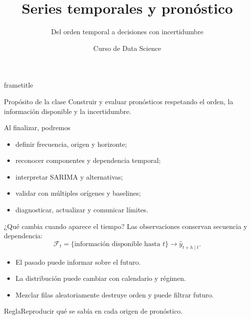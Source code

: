 \documentclass[aspectratio=169,10pt]{beamer}
\title[Data Science · Clase 7]{Series temporales y pronóstico}
\subtitle{Del orden temporal a decisiones con incertidumbre}
\author{Curso de Data Science}
\institute{Semana 7 · Clase 7 · Cierre del curso}
\date{}
\begin{document}
\begin{frame}[plain]
\begin{beamercolorbox}[wd=\paperwidth,ht=\paperheight,sep=2em]{frametitle}
\vfill {\Huge\bfseries\inserttitle\par}\vspace{.45em}{\color{UAPGold}\Large\insertsubtitle\par}\vspace{1.1em}
\par\vfill {\color{UAPGold}\large\insertauthor\par}{\color{white}\insertinstitute\par}
\end{beamercolorbox}
\end{frame}

\begin{frame}{Propósito de la clase}\small
Construir y evaluar pronósticos respetando el orden, la información disponible y la incertidumbre.
\begin{block}{Al finalizar, podremos}\begin{itemize}\item definir frecuencia, origen y horizonte;\item reconocer componentes y dependencia temporal;\item interpretar SARIMA y alternativas;\item validar con múltiples orígenes y baselines;\item diagnosticar, actualizar y comunicar límites.\end{itemize}\end{block}
\end{frame}

\begin{frame}{¿Qué cambia cuando aparece el tiempo?}\small
Las observaciones conservan secuencia y dependencia:
\[\mathcal F_t=\{\text{información disponible hasta }t\}\longrightarrow\widehat y_{t+h\mid t}.\]
\begin{itemize}\item El pasado puede informar sobre el futuro.\item La distribución puede cambiar con calendario y régimen.\item Mezclar filas aleatoriamente destruye orden y puede filtrar futuro.\end{itemize}
\begin{block}{Regla}Reproducir qué se sabía en cada origen de pronóstico.\end{block}
\end{frame}
\end{document}
